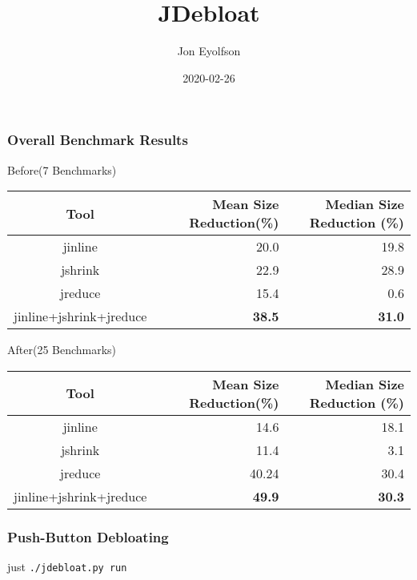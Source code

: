 \documentclass[aspectratio=169]{beamer}
\title{JDebloat}
\author{Jon Eyolfson}
\date{2020-02-26}
\begin{document}
  \begin{frame}[plain]
    \titlepage
  \end{frame}

  \setcounter{framenumber}{0}

  \begin{frame}
    \frametitle{Overall Benchmark Results}
    Before(7 Benchmarks)
    \begin{center}
      \begin{tabular}{c|r|r}
        \textbf{Tool} &
        \textbf{Mean Size Reduction(\%)} &
        \textbf{Median Size Reduction (\%)}\\
        \hline
        jinline & 20.0 & 19.8\\
        jshrink & 22.9 & 28.9\\
        jreduce & 15.4 & 0.6\\
        jinline+jshrink+jreduce & \textbf{38.5} & \textbf{31.0}\\
      \end{tabular}
    \end{center}

    \vspace{1em}

    After(25 Benchmarks)
    \begin{center}
      \begin{tabular}{c|r|r}
        \textbf{Tool} &
        \textbf{Mean Size Reduction(\%)} &
        \textbf{Median Size Reduction (\%)}\\
        \hline
        jinline & 14.6 & 18.1\\
        jshrink & 11.4 & 3.1\\
        jreduce & 40.24 & 30.4\\
        jinline+jshrink+jreduce & \textbf{49.9} & \textbf{30.3}\\
      \end{tabular}
    \end{center}
  \end{frame}

  \begin{frame}
    \frametitle{Push-Button Debloating}
    just \texttt{./jdebloat.py run}
  \end{frame}
\end{document}
